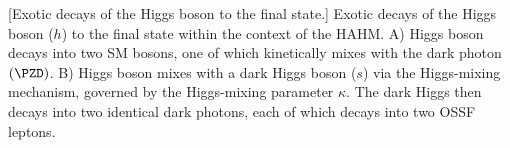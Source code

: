 \begin{multiFigure}
        \centering
            [Exotic decays of the Higgs boson to the \fourl final state.]
            {Exotic decays of the Higgs boson ($h$) to the \fourl final state within the context of the HAHM.
            A) Higgs boson decays into two SM \PZ bosons, one of which kinetically mixes with the dark photon $\left(\PZD\right)$.
            B) Higgs boson mixes with a dark Higgs boson ($s$) via the Higgs-mixing mechanism, governed by the Higgs-mixing parameter $\kappa$.
            The dark Higgs then decays into two identical dark photons, each of which decays into two OSSF leptons.}
        \label{fig:feyn_diag_hzzd4l_hzdzd4l}
\end{multiFigure}

